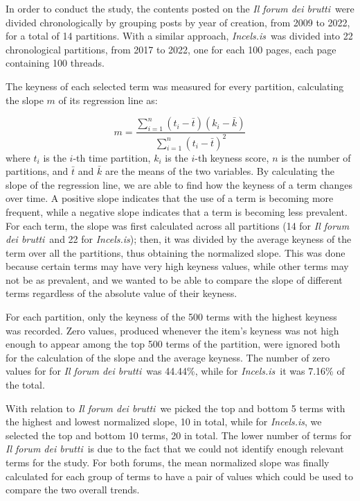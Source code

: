 \documentclass[11pt]{article}
\newcommand{\enforum}{\textit{Incels.is}}
\newcommand{\itforum}{\textit{Il forum dei brutti}}
\begin{document}
In order to conduct the study, the contents posted on the \itforum\, were divided chronologically by grouping posts by year of creation, from 2009 to 2022, for a total of 14 partitions. With a similar approach, \enforum\, was divided into 22 chronological partitions, from 2017 to 2022, one for each 100 pages, each page containing 100 threads.

The keyness of each selected term was measured for every partition, calculating the slope $m$ of its regression line as:


\begin{equation}
  \label{eq:slope}
  m = \frac{\sum_{i=1}^{n} (t_i - \bar{t})(k_i - \bar{k})}{\sum_{i=1}^{n} (t_i - \bar{t})^2}
\end{equation}
where $t_i$ is the $i$-th time partition, $k_i$ is the $i$-th keyness score, $n$ is the number of partitions, and $\bar{t}$ and $\bar{k}$ are the means of the two variables. By calculating the slope of the regression line, we are able to find how the keyness of a term changes over time. A positive slope indicates that the use of a term is becoming more frequent, while a negative slope indicates that a term is becoming less prevalent. For each term, the slope was first calculated across all partitions (14 for \itforum\, and 22 for \enforum); then, it was divided by the average keyness of the term over all the partitions, thus obtaining the normalized slope. This was done because certain terms may have very high keyness values, while other terms may not be as prevalent, and we wanted to be able to compare the slope of different terms regardless of the absolute value of their keyness.

For each partition, only the keyness of the 500 terms with the highest keyness was recorded. Zero values, produced whenever the item's keyness was not high enough to appear among the top 500 terms of the partition, were ignored both for the calculation of the slope and the average keyness. The number of zero values for for \itforum\, was 44.44\%, while for \enforum\, it was 7.16\% of the total.

With relation to \itforum\, we picked the top and bottom 5 terms with the highest and lowest normalized slope, 10 in total, while for \enforum, we selected the top and bottom 10 terms, 20 in total. The lower number of terms for \itforum\, is due to the fact that we could not identify enough relevant terms for the study. For both forums, the mean normalized slope was finally calculated for each group of terms to have a pair of values which could be used to compare the two overall trends.
\end{document}
